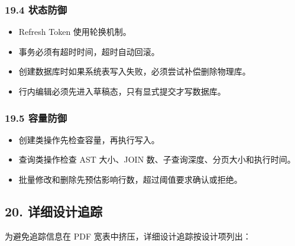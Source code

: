 \documentclass[
  a4paper,
  UTF8]{ctexart}
\providecommand{\tightlist}{%
  \setlength{\itemsep}{0pt}\setlength{\parskip}{0pt}}
\begin{document}
\hypertarget{ux72b6ux6001ux9632ux5fa1}{%
\subsubsection{19.4 状态防御}\label{ux72b6ux6001ux9632ux5fa1}}

\begin{itemize}
\tightlist
\item
  Refresh Token 使用轮换机制。
\item
  事务必须有超时时间，超时自动回滚。
\item
  创建数据库时如果系统表写入失败，必须尝试补偿删除物理库。
\item
  行内编辑必须先进入草稿态，只有显式提交才写数据库。
\end{itemize}

\hypertarget{ux5bb9ux91cfux9632ux5fa1}{%
\subsubsection{19.5 容量防御}\label{ux5bb9ux91cfux9632ux5fa1}}

\begin{itemize}
\tightlist
\item
  创建类操作先检查容量，再执行写入。
\item
  查询类操作检查 AST 大小、JOIN 数、子查询深度、分页大小和执行时间。
\item
  批量修改和删除先预估影响行数，超过阈值要求确认或拒绝。
\end{itemize}

\hypertarget{ux8be6ux7ec6ux8bbeux8ba1ux8ffdux8e2a}{%
\subsection{20.
详细设计追踪}\label{ux8be6ux7ec6ux8bbeux8ba1ux8ffdux8e2a}}

为避免追踪信息在 PDF 宽表中挤压，详细设计追踪按设计项列出：
\end{document}
